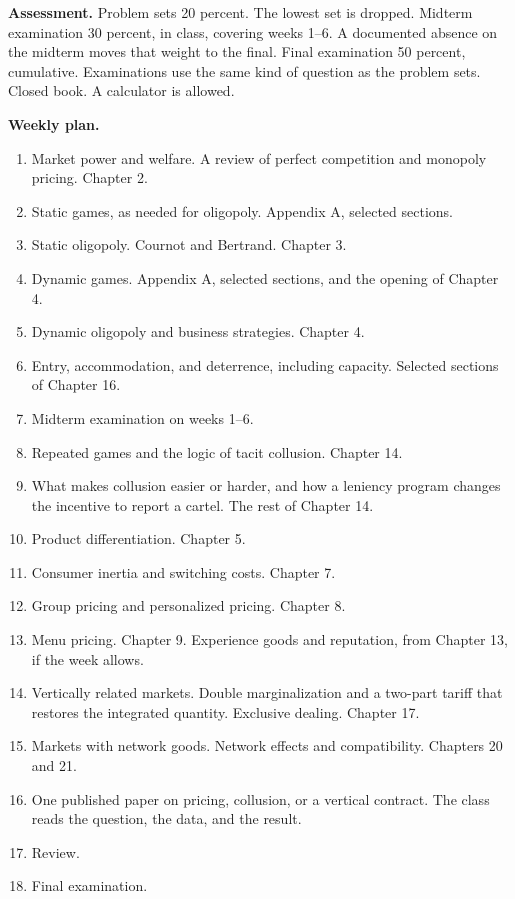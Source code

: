 \documentclass[11pt]{article}
\begin{document}
\textbf{Assessment.}
Problem sets 20 percent. The lowest set is dropped. Midterm examination 30 percent, in class, covering weeks 1--6. A documented absence on the midterm moves that weight to the final. Final examination 50 percent, cumulative. Examinations use the same kind of question as the problem sets. Closed book. A calculator is allowed.

\textbf{Weekly plan.}
\begin{enumerate}
\item Market power and welfare. A review of perfect competition and monopoly pricing. Chapter 2.
\item Static games, as needed for oligopoly. Appendix A, selected sections.
\item Static oligopoly. Cournot and Bertrand. Chapter 3.
\item Dynamic games. Appendix A, selected sections, and the opening of Chapter 4.
\item Dynamic oligopoly and business strategies. Chapter 4.
\item Entry, accommodation, and deterrence, including capacity. Selected sections of Chapter 16.
\item Midterm examination on weeks 1--6.
\item Repeated games and the logic of tacit collusion. Chapter 14.
\item What makes collusion easier or harder, and how a leniency program changes the incentive to report a cartel. The rest of Chapter 14.
\item Product differentiation. Chapter 5.
\item Consumer inertia and switching costs. Chapter 7.
\item Group pricing and personalized pricing. Chapter 8.
\item Menu pricing. Chapter 9. Experience goods and reputation, from Chapter 13, if the week allows.
\item Vertically related markets. Double marginalization and a two-part tariff that restores the integrated quantity. Exclusive dealing. Chapter 17.
\item Markets with network goods. Network effects and compatibility. Chapters 20 and 21.
\item One published paper on pricing, collusion, or a vertical contract. The class reads the question, the data, and the result.
\item Review.
\item Final examination.
\end{enumerate}
\end{document}
